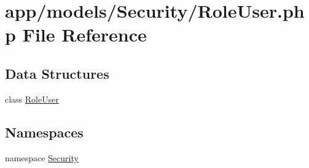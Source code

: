 \hypertarget{_role_user_8php}{\section{app/models/\-Security/\-Role\-User.php File Reference}
\label{_role_user_8php}
}
\subsection*{Data Structures}
\begin{DoxyCompactItemize}
\item 
class \hyperlink{class_security_1_1_role_user}{Role\-User}
\end{DoxyCompactItemize}
\subsection*{Namespaces}
\begin{DoxyCompactItemize}
\item 
namespace \hyperlink{namespace_security}{Security}
\end{DoxyCompactItemize}
